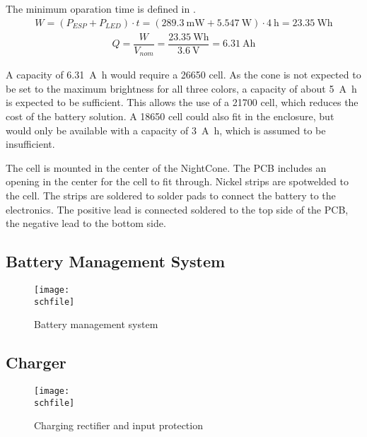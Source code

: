 The minimum oparation time is defined in . 
\begin{align}
    W = \left(P_{ESP} + P_{LED}\right) \cdot t = \left(\SI{289.3}{\milli\watt} + \SI{5.547}{\watt}\right) \cdot \SI{4}{\hour} = \SI{23.35}{\watt\hour}
\end{align}
\begin{align}
    Q = \dfrac{W}{V_{nom}} = \dfrac{\SI{23.35}{\watt\hour}}{\SI{3.6}{\volt}} = \SI{6.31}{\ampere\hour}
\end{align}

A capacity of \SI{6.31}{\ampere\hour} would require a 26650 cell. As the cone is not expected to be set to the maximum brightness for all three colors, a capacity of about \SI{5}{\ampere\hour} is expected to be sufficient. This allows the use of a 21700 cell, which reduces the cost of the battery solution. A 18650 cell could also fit in the enclosure, but would only be available with a capacity of \SI{3}{\ampere\hour}, which is assumed to be insufficient. 

The cell is mounted in the center of the NightCone. The \ac{PCB} includes an opening in the center for the cell to fit through. Nickel strips are spotwelded to the cell. The strips are soldered to solder pads to connect the battery to the electronics. The positive lead is connected soldered to the top side of the \ac{PCB}, the negative lead to the bottom side. 

\subsection{Battery Management System}
\label{sec_bms}

\begin{figure}[h!]
    \centering
    \texttt{[image: \\schfile]}
    \caption{Battery management system}
    \label{fig_bms}
\end{figure}

\FloatBarrier

\subsection{Charger}
\label{sec_charger}

\begin{figure}[h!]
    \centering
    \texttt{[image: \\schfile]}
    \caption{Charging rectifier and input protection}
    \label{fig_chg_input}
\end{figure}

